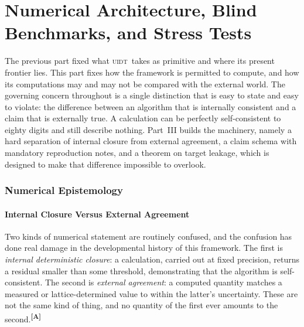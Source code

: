 \documentclass[12pt,a4paper,twoside]{article}
\theoremstyle{plain}
\theoremstyle{definition}
\theoremstyle{remark}
\newcommand{\UIDT}{\textsc{uidt}}
\newcommand{\catmark}[1]{\textsuperscript{\textsf{\textbf{[#1]}}}}
\begin{document}
\part{Numerical Architecture, Blind Benchmarks, and Stress Tests}
\label{part:numerical-architecture}

\noindent The previous part fixed what \UIDT\ takes as primitive and where its present frontier lies. This part fixes how the framework is permitted to compute, and how its computations may and may not be compared with the external world. The governing concern throughout is a single distinction that is easy to state and easy to violate: the difference between an algorithm that is internally consistent and a claim that is externally true. A calculation can be perfectly self-consistent to eighty digits and still describe nothing. Part~III builds the machinery, namely a hard separation of internal closure from external agreement, a claim schema with mandatory reproduction notes, and a theorem on target leakage, which is designed to make that difference impossible to overlook.

\section{Numerical Epistemology}
\label{sec:numerical-epistemology}

\subsection{Internal Closure Versus External Agreement}
\label{subsec:closure-vs-agreement}

Two kinds of numerical statement are routinely confused, and the confusion has done real damage in the developmental history of this framework. The first is \emph{internal deterministic closure}: a calculation, carried out at fixed precision, returns a residual smaller than some threshold, demonstrating that the algorithm is self-consistent. The second is \emph{external agreement}: a computed quantity matches a measured or lattice-determined value to within the latter's uncertainty. These are not the same kind of thing, and no quantity of the first ever amounts to the second.\catmark{A}
\end{document}
